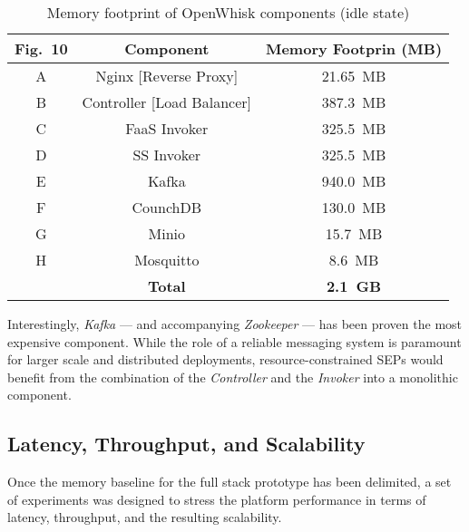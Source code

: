 \begin{table}[tbp]
\renewcommand{\arraystretch}{1.3}
\caption{Memory footprint of OpenWhisk components (idle state)}
\label{tab:OPENWHISK_MEM_FOOTPRINT}
\centering
\begin{tabular}{|c|c|c|}
\hline
\textbf{Fig.~10}& \textbf{Component} & \textbf{Memory Footprin (MB)}\\
\hline
A & Nginx [Reverse Proxy] & 21.65~MB\\
\hline
B & Controller [Load Balancer]         & 387.3~MB\\
\hline
C & FaaS Invoker             & 325.5~MB\\
\hline
D & SS Invoker             & 325.5~MB\\
\hline
E & Kafka               & 940.0~MB\\
\hline
F & CounchDB            & 130.0~MB\\
\hline
G & Minio               & 15.7~MB\\
\hline
H & Mosquitto           & 8.6~MB\\
\hline
    & \textbf{Total}  & \textbf{2.1~GB}\\
\hline
\end{tabular}
\end{table}


Interestingly, \textit{Kafka} --- and accompanying \textit{Zookeeper} --- has been proven the most expensive component. While the role of a reliable messaging system is paramount for larger scale and distributed deployments, resource-constrained SEPs would benefit from the combination of the \textit{Controller} and the \textit{Invoker} into a monolithic component.

\subsection{Latency, Throughput, and Scalability}

Once the memory baseline for the full stack prototype has been delimited, a set of experiments was designed to stress the platform performance in terms of latency, throughput, and the resulting scalability.

